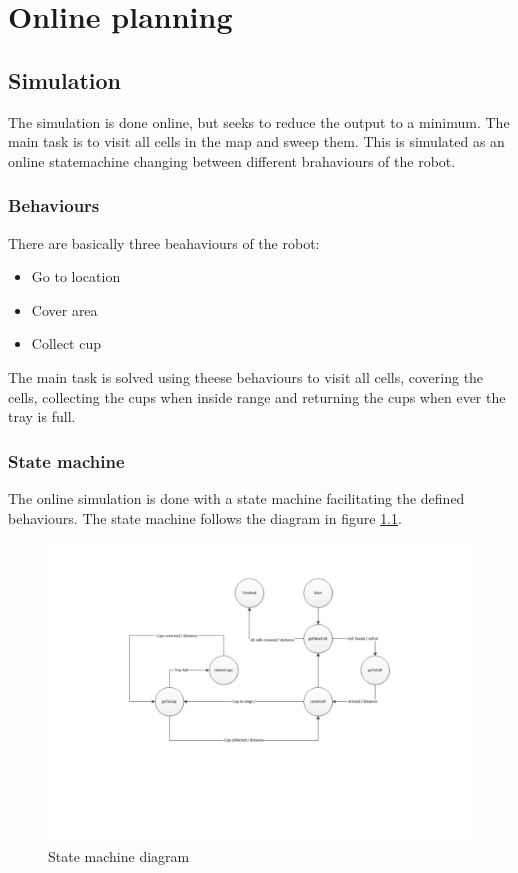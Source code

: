 \chapter{Online planning}\label{chap:online planning}

\section{ Simulation }
The simulation is done online, but seeks to reduce the output to a minimum. The
main task is to visit all cells in the map and sweep them. This is simulated as
an online statemachine changing between different brahaviours of the robot.

\subsection{Behaviours}
There are basically three beahaviours of the robot:

\begin{itemize}
  \item Go to location
  \item Cover area
  \item Collect cup
\end{itemize}

The main task is solved using theese behaviours to visit all cells, covering the
cells, collecting the cups when inside range and returning the cups when ever
the tray is full.

\subsection{State machine}
The online simulation is done with a state machine facilitating the defined
behaviours. The state machine follows the diagram in figure
\ref{fig:statemachine}.

\begin{figure}[htb]
	\centering
	\includegraphics[width=\textwidth,trim=0 0 0 0]{graphics/statemachine.pdf}
	\caption{State machine diagram}
	\label{fig:statemachine}			
\end{figure}